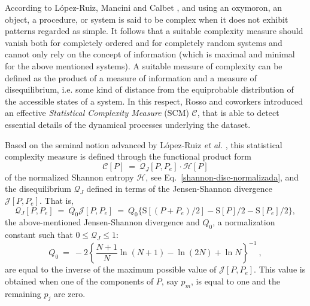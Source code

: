 According to L\'opez-Ruiz, Mancini and Calbet \cite{LMC1995}, and using an oxymoron, an object, a procedure, 
or system is said to be complex when it does not exhibit patterns regarded as simple. 
It follows that a suitable complexity measure should vanish both for completely ordered and for completely 
random systems and cannot only rely on the concept of information (which is maximal and minimal for the 
above mentioned systems).
A suitable measure of complexity can be defined as the product of a measure of information and a measure of
disequilibrium, i.e. some kind of distance from the equiprobable distribution of the accessible states of 
a system. 
In this respect, Rosso and coworkers \cite{Lamberti2004} introduced an effective {\it Statistical Complexity 
	Measure\/} (SCM) ${\mathcal C}$, that is able to detect essential details of the dynamical processes 
underlying the dataset.

Based on the seminal notion advanced by L\'opez-Ruiz {\it et al.} \cite{LMC1995}, this statistical complexity 
measure\cite{Martin2003,Lamberti2004} is defined through the functional product form
\begin{equation}
{\mathcal C}[P] ~=~ {\mathcal Q}_{J}[P,P_e] \cdot {\mathcal H}[P]
\label{complexity}
\end{equation}
of the normalized Shannon entropy ${\mathcal H}$, see Eq.~\eqref{shannon-disc-normalizada}, and the disequilibrium 
${\mathcal Q}_{J}$ defined in terms of the Jensen-Shannon divergence ${\mathcal J}[ P, P_e]$.
That is,
\begin{equation}
\label{disequilibrium}
{\mathcal Q}_{J} [ P, P_e] ~=~ Q_{0} {\mathcal J}[ P, P_e] ~=~ 
Q_{0} \{ {\mathrm S}[(P + P_e)/2 ] - {\mathrm S}[ P ]/2 - {\mathrm S}[P_e]/2\},
\end{equation}
the above-mentioned Jensen-Shannon divergence and $Q_0$, a normalization constant 
such that $0 \leq {\mathcal Q}_{J} \leq 1$:
\begin{equation}
Q_0 ~=~ -2 \left\{  {\frac{N+1}{N}}  \ln (N+1) - \ln (2N)  +  \ln N \right\}^{-1} \ ,
\label{q0-jensen-1}
\end{equation}
are equal to the inverse of the maximum possible value of ${\mathcal J} [P,P_e]$.
This value is obtained when one of the components of $P$, say $p_m$, is equal to one and the remaining $p_j$ 
are zero.

